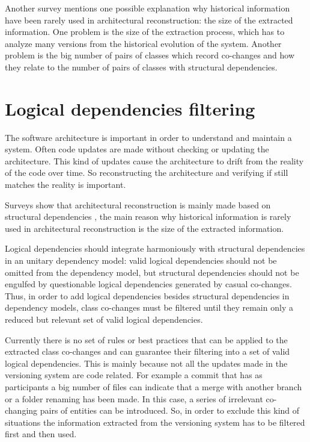 \documentclass[12pt]{mitthesis}
\begin{document}
Another survey \cite{Shtern:2012:CMS:2332427.2332428} mentions one possible explanation why historical information have been rarely used in architectural reconstruction: the size of the extracted information. One problem is the size of the extraction process, which has to analyze many versions from the historical evolution of the system. Another problem is the big number of pairs of classes which record co-changes and how they relate to the number of pairs of classes with structural dependencies.

\chapter{Logical dependencies filtering}
The software architecture is important in order to understand and maintain a system. Often code updates are made without checking or updating the architecture. This kind of updates cause the architecture to drift from the reality of the code over time.\cite{sar}
So reconstructing the architecture and verifying if still matches the reality is important. 

Surveys show that architectural reconstruction is mainly made based on structural dependencies \cite{Shtern:2012:CMS:2332427.2332428} \cite{sar}, the main reason why historical information is rarely used in architectural reconstruction is the size of the extracted information.

Logical dependencies should integrate harmoniously with structural dependencies in an unitary dependency model: valid logical dependencies should not be omitted from the dependency model, but structural dependencies should not be engulfed by questionable logical dependencies generated by casual co-changes.  
Thus, in order to add logical dependencies besides structural dependencies in dependency models, class co-changes must be filtered until they remain only a reduced but relevant set of valid logical dependencies. 

Currently there is no set of rules or best practices that can be applied to the extracted class co-changes and can guarantee their filtering into a set of valid logical dependencies.
This is mainly because not all the updates made in the versioning system are code related. For example a commit that has as participants a big number of files can indicate that a merge with another branch or a folder renaming has been made. In this case, a series of irrelevant co-changing pairs of entities can be introduced. So, in order to exclude this kind of situations the information extracted from the versioning system has to be filtered first and then used.
\end{document}
